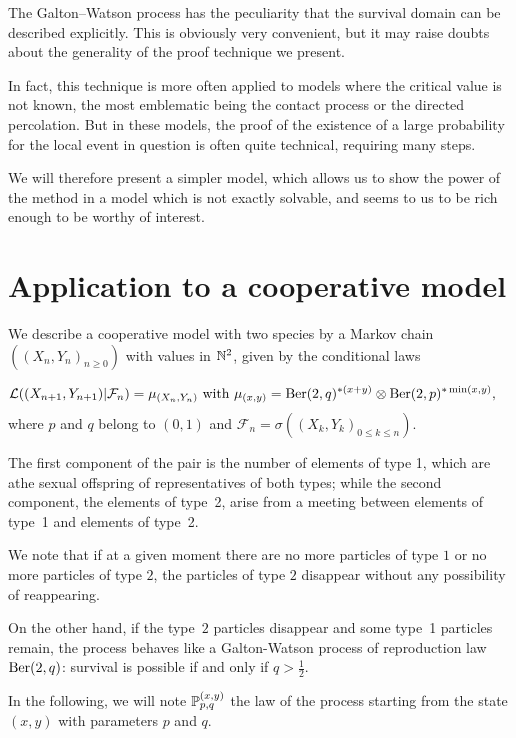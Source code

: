 The Galton--Watson process has the peculiarity that the survival domain can be described explicitly.
This is obviously very convenient, but it may raise doubts about the generality of the proof technique we present.

In fact, this technique is more often applied to models where the critical value is not known, the most emblematic being the contact process or the directed percolation.
But in these models, the proof of the existence of a large probability for the local event in question is often quite technical, requiring many steps.

We will therefore present a simpler model, which allows us to show the power of the method in a model which is not exactly solvable, and seems to us to be rich enough to be worthy of interest. 



\section {Application to a cooperative model}

We describe a cooperative model with two species by a Markov chain $((X_n,Y_n)_{n\ge 0})$ with values in $\N^2$, given by the conditional laws

\begin{align*}
  \mathcal{L}((X_{n+1},Y_{n+1})|\mathcal{F}_n)&=\mu_{(X_n,Y_n)}\text{ with }\mu_{(x,y)}=\ber(2,q)^{*(x+y)}\otimes \ber(2,p)^{*\min(x,y)},
\end{align*}
where $p$ and $q$ belong to $(0,1)$ and $\mathcal{F}_n=\sigma((X_k,Y_k)_{0\le k\le n})$.

The first component of the pair is the number of elements of type 1, which are athe sexual offspring of representatives of both types; while the second component, the elements of type~2, arise from a meeting between elements of type~1 and elements of type~2.


We note that if at a given moment there are no more particles of type $1$ or no more particles of type $2$, the particles of type $2$ disappear without any possibility of reappearing.

On the other hand, if the type~$2$ particles disappear and some type~1 particles remain, the  process behaves like a Galton-Watson process of reproduction law $\ber(2,q)$:  survival is possible if and only if $q>\frac12$.

In the following, we will note $\P^{(x,y)}_{p,q}$ the law of the process starting from the state $(x,y)$ with parameters $p$ and $q$.


